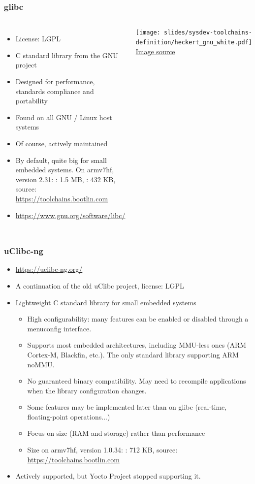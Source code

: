 \begin{frame}
  \frametitle{glibc}
  \begin{columns}
    \begin{itemize}
    \item License: LGPL
    \item C standard library from the GNU project
    \item Designed for performance, standards compliance and portability
    \item Found on all GNU / Linux host systems
    \item Of course, actively maintained
    \item By default, quite big for small embedded systems.
      On armv7hf, version 2.31: : 1.5 MB, : 432
      KB, source: \url{https://toolchains.bootlin.com}
    \item \url{https://www.gnu.org/software/libc/}
    \end{itemize}
    \vfill
    \minipage[c][0.8\textheight][s]{\columnwidth}
    \texttt{[image: slides/sysdev-toolchains-definition/heckert\_gnu\_white.pdf]}
    \vfill
    \tiny \href{https://en.wikipedia.org/wiki/File:Heckert_GNU_white.svg}{Image source}
    \endminipage
  \end{columns}
\end{frame}

\begin{frame}
  \frametitle{uClibc-ng}
  \begin{itemize}
  \item \url{https://uclibc-ng.org/}
  \item A continuation of the old uClibc project, license: LGPL
  \item Lightweight C standard library for small embedded systems
    \begin{itemize}
    \item High configurability: many features can be enabled or
      disabled through a menuconfig interface.
    \item Supports most embedded architectures, including MMU-less
          ones (ARM Cortex-M, Blackfin, etc.). The only standard library
          supporting ARM noMMU.
    \item No guaranteed binary compatibility. May need to
      recompile applications when the library configuration changes.
    \item Some features may be implemented later than on glibc (real-time,
          floating-point operations...)
    \item Focus on size (RAM and storage) rather than performance
    \item Size on armv7hf, version 1.0.34:
      : 712 KB, source: \url{https://toolchains.bootlin.com}
    \end{itemize}
    \item Actively supported, but Yocto Project stopped supporting it.
  \end{itemize}
\end{frame}

